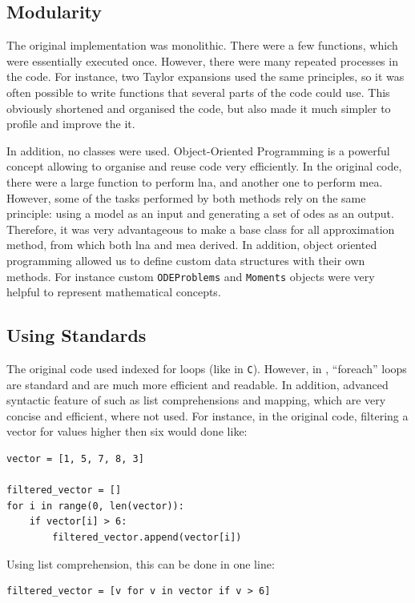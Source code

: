 \subsection{Modularity}

The original implementation was monolithic.
There were a few functions, which were essentially executed once.
However, there were many repeated processes in the code.
For instance, two Taylor expansions used the same principles,
so it was often possible to write functions that several parts of the code could use.
This obviously shortened and organised the code, but also made it much simpler to profile and improve the it.
 
In addition, no classes were used.
Object-Oriented Programming is a powerful concept allowing to organise and reuse code very efficiently.
In the original code, there were a large function to perform \gls{lna}, and another one to perform \gls{mea}.
However, some of the tasks performed by both methods rely on the same principle: using a model as an input and generating a set of \glspl{ode} as an output.
Therefore, it was very advantageous to make a base class for all approximation method, from which both \gls{lna} and \gls{mea} derived.
In addition, object oriented programming allowed us to define custom data structures with their own methods.
For instance custom \texttt{ODEProblems} and \texttt{Moments} objects were very helpful to represent mathematical concepts.

\subsection{Using \py{} Standards}
The original code used indexed for loops (like in \texttt{C}).
However, in \py, ``foreach'' loops are  standard and are much more efficient and readable.
In addition, advanced syntactic feature of \py{} such as list comprehensions  and mapping,
which are very concise and efficient, where not used.
For instance, in the original code, filtering a vector for values higher then six would done like:

\begin{verbatim}
vector = [1, 5, 7, 8, 3]

filtered_vector = []
for i in range(0, len(vector)):
    if vector[i] > 6:
        filtered_vector.append(vector[i])
\end{verbatim}

Using list comprehension, this can be done in one line:

\begin{verbatim}
filtered_vector = [v for v in vector if v > 6]
\end{verbatim}

